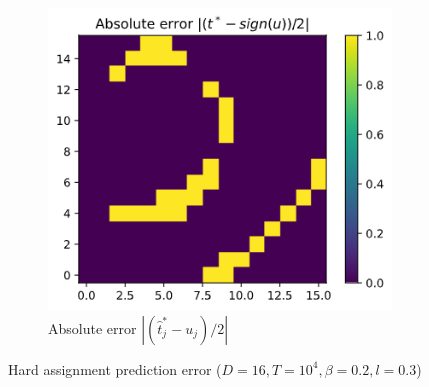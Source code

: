 \documentclass[]{article}
\begin{document}
\begin{figure}[!h]
\begin{subfigure}{0.31\linewidth}
		\includegraphics[width=\linewidth]{t-abs-error.png}
		\caption{Absolute error $|(\hat{t}^*_j - u_j)/2|$}
		\label{fig:t-err}
	\end{subfigure}
	\caption{Hard assignment prediction error ($D=16, T=10^4, \beta=0.2, l=0.3$)}
	\label{fig:t-hard-err}
\end{figure}
\end{document}
